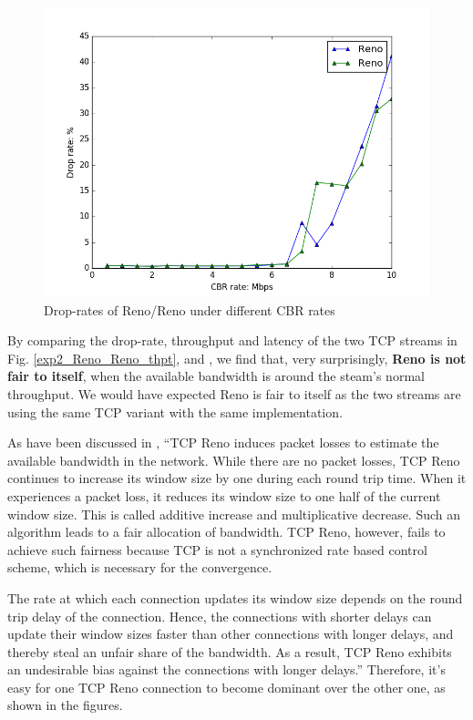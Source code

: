 \documentclass[10pt, conference]{IEEEtran/IEEEtran}
\begin{document}
\begin{figure}[!ht]
\begin{center}
\includegraphics[width=\linewidth]{../exp2/exp2_Reno_Reno_drop.png}
\caption{Drop-rates of Reno/Reno under different CBR rates}
\label{exp2_Reno_Reno_drop}
\end{center}
\end{figure}


By comparing the drop-rate, throughput and latency of the two TCP streams in Fig. \ref{exp2_Reno_Reno_thpt}, \label{exp2_Reno_Reno_lat} and \label{exp2_Reno_Reno_drop}, we find that, very surprisingly, \textbf{Reno is not fair to itself}, when the available bandwidth is around the steam's normal throughput. We would have expected Reno is fair to itself as the two streams are using the same TCP variant with the same implementation. 

As have been discussed in \cite{reno}, ``TCP Reno induces packet losses to estimate the available bandwidth in the network. While there
are no packet losses, TCP Reno continues to increase its window size by one during each round
trip time. When it experiences a packet loss, it reduces its window size to one half of the current
window size. This is called additive increase and multiplicative decrease. Such
an algorithm leads to a fair allocation of bandwidth. TCP Reno, however, fails to achieve such
fairness because TCP is not a synchronized rate based control scheme, which is necessary for the
convergence.

The rate at which each connection updates its window size depends on the round trip delay of
the connection. Hence, the connections with shorter delays can update their window sizes faster
than other connections with longer delays, and thereby steal an unfair share of the bandwidth. As
a result, TCP Reno exhibits an undesirable bias against the connections with longer delays.'' Therefore, it's easy for one TCP Reno connection to become dominant over the other one, as shown in the figures.
\end{document}
